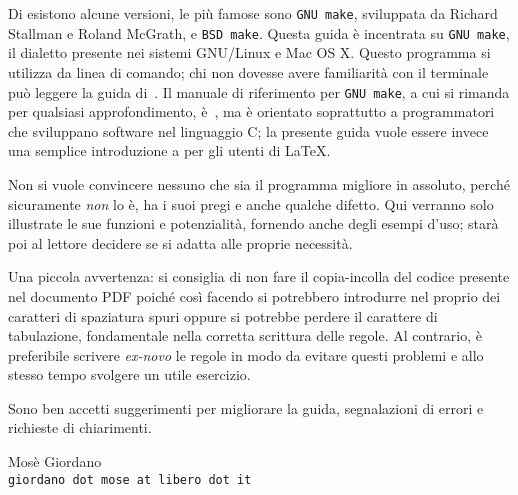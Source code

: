 Di  esistono alcune versioni, le più famose sono
\texttt{GNU make}, sviluppata da Richard Stallman e Roland McGrath, e
\texttt{BSD make}.  Questa guida è incentrata su \texttt{GNU make}, il dialetto
presente nei sistemi GNU/Linux e Mac OS X.  Questo programma si utilizza da
linea di comando; chi non dovesse avere familiarità con il terminale può leggere
la guida di~\cite{giacomelli:console}.  Il manuale di riferimento per
\texttt{GNU make}, a cui si rimanda per qualsiasi approfondimento,
è~\cite{gnu:make}, ma è orientato soprattutto a programmatori che sviluppano
software nel linguaggio C; la presente guida vuole essere invece una semplice
introduzione a  per gli utenti di \LaTeX{}.

Non si vuole convincere nessuno che  sia il programma migliore
in assoluto, perché sicuramente \emph{non} lo è, ha i suoi pregi e anche qualche
difetto.  Qui verranno solo illustrate le sue funzioni e potenzialità, fornendo
anche degli esempi d'uso; starà poi al lettore decidere se  si
adatta alle proprie necessità.

Una piccola avvertenza: si consiglia di non fare il copia-incolla del codice
presente nel documento \textsc{PDF} poiché così facendo si potrebbero introdurre
nel proprio  dei caratteri di spaziatura spuri oppure si
potrebbe perdere il carattere di tabulazione, fondamentale nella corretta
scrittura delle regole.  Al contrario, è preferibile scrivere \emph{ex-novo} le
regole in modo da evitare questi problemi e allo stesso tempo svolgere un utile
esercizio.

Sono ben accetti suggerimenti per migliorare la guida, segnalazioni di errori e
richieste di chiarimenti.

\begin{flushright}
\begin{minipage}{0.6\textwidth}\centering
Mosè Giordano \\
\texttt{giordano dot mose at libero dot it}
\end{minipage}
\end{flushright}

